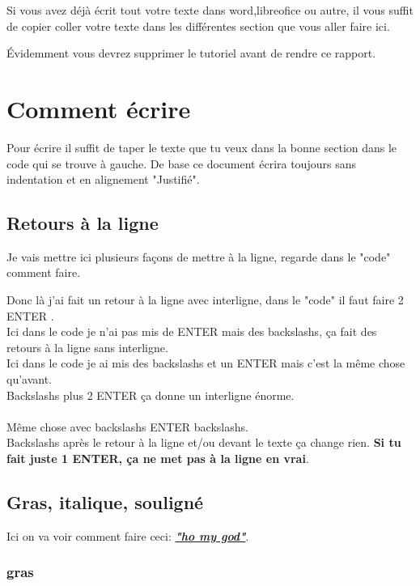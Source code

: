 \documentclass{report}
\begin{document}
Si vous avez déjà écrit tout votre texte dans word,libreofice ou autre, il vous suffit de copier coller votre texte dans les différentes section que vous aller faire ici.

Évidemment vous devrez supprimer le tutoriel avant de rendre ce rapport.


\chapter{Comment écrire}

Pour écrire il suffit de taper le texte que tu veux dans la bonne section dans le code qui se trouve à gauche.
De base ce document écrira toujours sans indentation et en alignement "Justifié".

\section{Retours à la ligne}

Je vais mettre ici plusieurs façons de mettre à la ligne, regarde dans le "code" comment faire.

Donc là j'ai fait un retour à la ligne avec interligne, dans le "code" il faut faire 2 ENTER .\\ Ici dans le code je n'ai pas mis de ENTER mais des backslashs, ça fait des retours à la ligne sans interligne.\\
Ici dans le code je ai mis des backslashs et un ENTER mais c'est la même chose qu'avant.\\

Backslashs plus 2 ENTER ça donne un interligne énorme.\\
\\
Même chose avec backslashs ENTER backslashs.
\\Backslashs après le retour à la ligne et/ou devant le texte ça change rien.
\textbf{Si tu fait juste 1 ENTER, ça ne met pas à la ligne en vrai}.


\section{Gras, italique, souligné}

Ici on va voir comment faire ceci: \textbf{\textit{\underline{"ho my god"}}}.

\subsection{gras}
\end{document}
